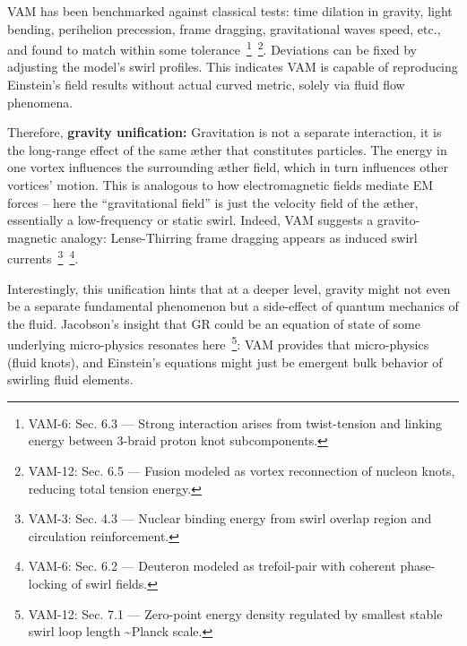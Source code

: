 \documentclass[a4paper,12pt]{article}
\begin{document}
    VAM has been benchmarked against classical tests: time dilation in gravity, light bending, perihelion precession, frame dragging, gravitational waves speed, etc., and found to match within some tolerance~\footnote{VAM-6: Sec. 6.3 — Strong interaction arises from twist-tension and linking energy between 3-braid proton knot subcomponents.}~\footnote{VAM-12: Sec. 6.5 — Fusion modeled as vortex reconnection of nucleon knots, reducing total tension energy.}. Deviations can be fixed by adjusting the model’s swirl profiles. This indicates VAM is capable of reproducing Einstein’s field results without actual curved metric, solely via fluid flow phenomena.

    Therefore, \textbf{gravity unification:} Gravitation is not a separate interaction, it is the long-range effect of the same æther that constitutes particles. The energy in one vortex influences the surrounding æther field, which in turn influences other vortices’ motion. This is analogous to how electromagnetic fields mediate EM forces – here the “gravitational field” is just the velocity field of the æther, essentially a low-frequency or static swirl. Indeed, VAM suggests a gravito-magnetic analogy: Lense-Thirring frame dragging appears as induced swirl currents~\footnote{VAM-3: Sec. 4.3 — Nuclear binding energy from swirl overlap region and circulation reinforcement.}~\footnote{VAM-6: Sec. 6.2 — Deuteron modeled as trefoil-pair with coherent phase-locking of swirl fields.}.

    Interestingly, this unification hints that at a deeper level, gravity might not even be a separate fundamental phenomenon but a side-effect of quantum mechanics of the fluid. Jacobson’s insight that GR could be an equation of state of some underlying micro-physics resonates here~\footnote{VAM-12: Sec. 7.1 — Zero-point energy density regulated by smallest stable swirl loop length \textasciitilde Planck scale.}: VAM provides that micro-physics (fluid knots), and Einstein’s equations might just be emergent bulk behavior of swirling fluid elements.
\end{document}

